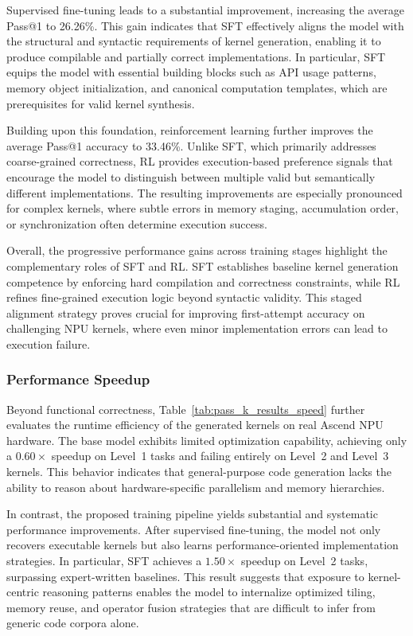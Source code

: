 Supervised fine-tuning leads to a substantial improvement, increasing the average Pass@1 to 26.26\%.
This gain indicates that SFT effectively aligns the model with the structural and syntactic requirements of kernel generation, enabling it to produce compilable and partially correct implementations.
In particular, SFT equips the model with essential building blocks such as API usage patterns, memory object initialization, and canonical computation templates, which are prerequisites for valid kernel synthesis.

Building upon this foundation, reinforcement learning further improves the average Pass@1 accuracy to 33.46\%.
Unlike SFT, which primarily addresses coarse-grained correctness, RL provides execution-based preference signals that encourage the model to distinguish between multiple valid but semantically different implementations.
The resulting improvements are especially pronounced for complex kernels, where subtle errors in memory staging, accumulation order, or synchronization often determine execution success.

Overall, the progressive performance gains across training stages highlight the complementary roles of SFT and RL.
SFT establishes baseline kernel generation competence by enforcing hard compilation and correctness constraints, while RL refines fine-grained execution logic beyond syntactic validity.
This staged alignment strategy proves crucial for improving first-attempt accuracy on challenging NPU kernels, where even minor implementation errors can lead to execution failure.


\subsubsection{Performance Speedup}

Beyond functional correctness, Table~\ref{tab:pass_k_results_speed} further evaluates the runtime efficiency of the generated kernels on real Ascend NPU hardware. 
The base model exhibits limited optimization capability, achieving only a $0.60\times$ speedup on Level~1 tasks and failing entirely on Level~2 and Level~3 kernels. 
This behavior indicates that general-purpose code generation lacks the ability to reason about hardware-specific parallelism and memory hierarchies.

In contrast, the proposed training pipeline yields substantial and systematic performance improvements. 
After supervised fine-tuning, the model not only recovers executable kernels but also learns performance-oriented implementation strategies. 
In particular, SFT achieves a $1.50\times$ speedup on Level~2 tasks, surpassing expert-written baselines. 
This result suggests that exposure to kernel-centric reasoning patterns enables the model to internalize optimized tiling, memory reuse, and operator fusion strategies that are difficult to infer from generic code corpora alone.


